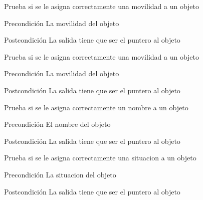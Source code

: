 \begin{DoxyRefList}
\item[\label{test__test000169}%
\hypertarget{test__test000169}{}%
Global \hyperlink{object__test_8c_af98804e9d1173f052213804914974f7f}{test1\-\_\-object\-\_\-set\-\_\-\-Mobile} ()]Prueba si se le asigna correctamente una movilidad a un objeto \begin{DoxyPrecond}{Precondición}
La movilidad del objeto 
\end{DoxyPrecond}
\begin{DoxyPostcond}{Postcondición}
La salida tiene que ser el puntero al objeto  
\end{DoxyPostcond}

\item[\label{test__test000171}%
\hypertarget{test__test000171}{}%
Global \hyperlink{object__test_8c_ab9a6f27507382d82283872290544df6b}{test1\-\_\-object\-\_\-set\-\_\-\-Moved} ()]Prueba si se le asigna correctamente una movilidad a un objeto \begin{DoxyPrecond}{Precondición}
La movilidad del objeto 
\end{DoxyPrecond}
\begin{DoxyPostcond}{Postcondición}
La salida tiene que ser el puntero al objeto  
\end{DoxyPostcond}

\item[\label{test__test000159}%
\hypertarget{test__test000159}{}%
Global \hyperlink{object__test_8c_a74e25ad653c4a32b9922fff8e4f916fd}{test1\-\_\-object\-\_\-set\-\_\-name} ()]Prueba si se le asigna correctamente un nombre a un objeto \begin{DoxyPrecond}{Precondición}
El nombre del objeto 
\end{DoxyPrecond}
\begin{DoxyPostcond}{Postcondición}
La salida tiene que ser el puntero al objeto  
\end{DoxyPostcond}

\item[\label{test__test000175}%
\hypertarget{test__test000175}{}%
Global \hyperlink{object__test_8c_ad8b7d77914a82f5b8d08f1dd2a385e4b}{test1\-\_\-object\-\_\-set\-\_\-\-Open} ()]Prueba si se le asigna correctamente una situacion a un objeto \begin{DoxyPrecond}{Precondición}
La situacion del objeto 
\end{DoxyPrecond}
\begin{DoxyPostcond}{Postcondición}
La salida tiene que ser el puntero al objeto  
\end{DoxyPostcond}


\end{DoxyRefList}
